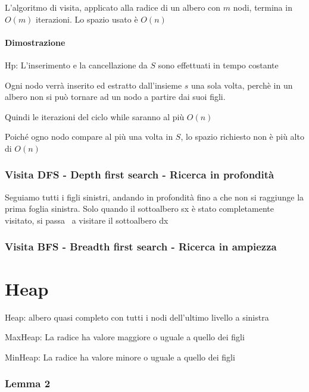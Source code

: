 \documentclass{article}
\let\oldparagraph\paragraph
\renewcommand{\paragraph}[1]{\oldparagraph{#1}\mbox{}}
\begin{document}
{{{{{L'algoritmo di visita, applicato alla radice di un albero con $m$ nodi, termina in $O(m)$ iterazioni. Lo spazio usato è $O(n)$}

\hypertarget{h.zdc8liauzt1c}{\paragraph{\texorpdfstring{{Dimostrazione}}{Dimostrazione}}\label{h.zdc8liauzt1c}}

{Hp: L'inserimento e la cancellazione da $S$ sono effettuati in tempo costante}

{Ogni nodo verrà inserito ed estratto dall'insieme $s$ una sola volta, perchè in un albero non si può tornare ad un nodo a partire dai suoi figli.}

{Quindi le iterazioni del ciclo while saranno al più $O(n)$}

{Poiché ogno nodo compare al più una volta in $S$, lo spazio richiesto non è più alto di $O(n)$}

\subsubsection{Visita DFS - Depth first search - Ricerca in profondità}

{Seguiamo tutti i figli sinistri, andando in profondità fino a che non si raggiunge la prima foglia sinistra. Solo quando il sottoalbero sx è stato completamente visitato, si passa ~a visitare il sottoalbero dx}



\subsubsection{Visita BFS - Breadth first search - Ricerca in ampiezza}

\section{Heap}

{Heap: albero quasi completo con tutti i nodi dell'ultimo livello a sinistra}

{MaxHeap: La radice ha valore maggiore o uguale a quello dei figli}

{MinHeap: La radice ha valore minore o uguale a quello dei figli}

\subsubsection{Lemma 2}

}}}}
\end{document}
